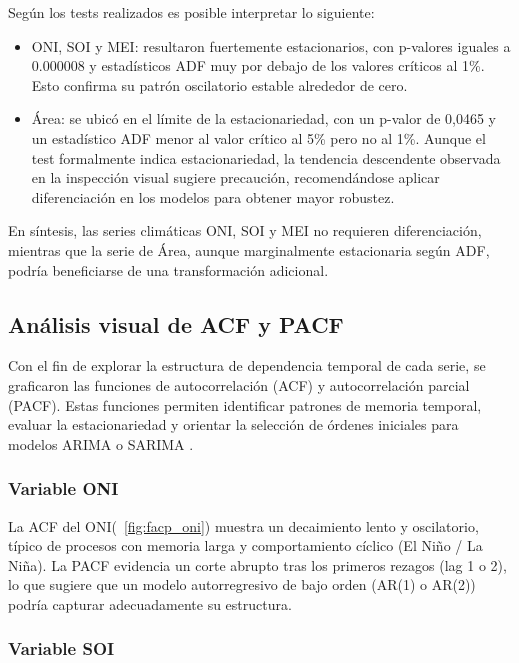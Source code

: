 Según los tests realizados es posible interpretar lo siguiente:   
\begin{itemize}
    \item ONI, SOI y MEI: resultaron fuertemente estacionarios, con p-valores 
    iguales a 0.000008 y estadísticos ADF muy por debajo de los valores críticos al 1\%. 
    Esto confirma su patrón oscilatorio estable alrededor de cero.
    \item Área: se ubicó en el límite de la estacionariedad, con un p-valor de 
    0,0465 y un estadístico ADF menor al valor crítico al 5\% pero no al 1\%. Aunque el 
    test formalmente indica estacionariedad, la tendencia descendente observada en la 
    inspección visual sugiere precaución, recomendándose aplicar diferenciación en los 
    modelos para obtener mayor robustez.
\end{itemize}


En síntesis, las series climáticas ONI, SOI y MEI no requieren diferenciación, mientras que 
la serie de Área, aunque marginalmente estacionaria según ADF, podría beneficiarse de 
una transformación adicional.

\subsection{Análisis visual de ACF y PACF}

Con el fin de explorar la estructura de dependencia temporal de cada serie, se graficaron 
las funciones de autocorrelación (ACF) y autocorrelación parcial (PACF). Estas funciones 
permiten identificar patrones de memoria temporal, evaluar la estacionariedad y orientar 
la selección de órdenes iniciales para modelos ARIMA o SARIMA \parencite{box2015time, hyndman2018forecasting}. 

\subsubsection{Variable ONI}

La ACF del ONI(~\ref{fig:facp_oni}) muestra un decaimiento lento y oscilatorio, típico de procesos con memoria 
larga y comportamiento cíclico (El Niño / La Niña). La PACF evidencia un corte abrupto 
tras los primeros rezagos (lag 1 o 2), lo que sugiere que un modelo autorregresivo de bajo 
orden (AR(1) o AR(2)) podría capturar adecuadamente su estructura.

\subsubsection{Variable SOI}

